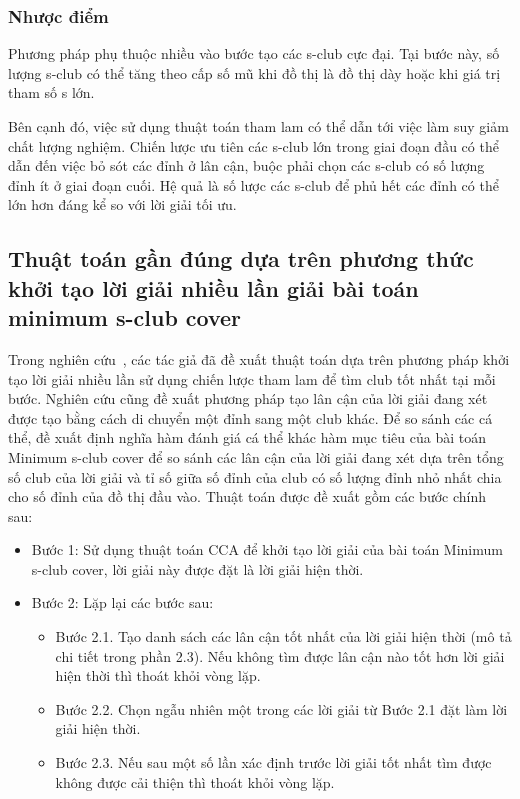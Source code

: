 \subsubsection{Nhược điểm}
Phương pháp phụ thuộc nhiều vào bước tạo các s-club cực đại. Tại bước này, số lượng s-club có thể tăng theo cấp số mũ khi đồ thị là đồ thị dày hoặc khi giá trị tham số s lớn.

Bên cạnh đó, việc sử dụng thuật toán tham lam có thể dẫn tới việc làm suy giảm chất lượng nghiệm. Chiến lược ưu tiên các s-club lớn trong giai đoạn đầu có thể dẫn đến việc bỏ sót các đỉnh ở lân cận, buộc phải chọn các s-club có số lượng đỉnh ít ở giai đoạn cuối. Hệ quả là số lược các s-club để phủ hết các đỉnh có thể lớn hơn đáng kể so với lời giải tối ưu.


\subsection{Thuật toán gần đúng dựa trên phương thức khởi tạo lời giải nhiều lần giải bài toán minimum s-club cover~\cite{thanh2023}}

Trong nghiên cứu~\cite{thanh2023}, các tác giả đã đề xuất thuật toán dựa trên phương pháp khởi tạo lời giải nhiều lần sử dụng chiến lược tham lam để tìm club tốt nhất tại mỗi bước. Nghiên cứu cũng đề xuất phương pháp tạo lân cận của lời giải đang xét được tạo bằng cách di chuyển một đỉnh sang một club khác. Để so sánh các cá thể, đề xuất định nghĩa hàm đánh giá cá thể khác hàm mục tiêu của bài toán Minimum s-club cover để so sánh các lân cận của lời giải đang xét dựa trên tổng số club của lời giải và tỉ số giữa số đỉnh của club có số lượng đỉnh nhỏ nhất chia cho số đỉnh của đồ thị đầu vào. Thuật toán được đề xuất gồm các bước chính sau:
\begin{itemize}
	\item Bước 1: Sử dụng thuật toán CCA để khởi tạo lời giải của bài toán Minimum s-club cover, lời giải này được đặt là lời giải hiện thời.
	\item Bước 2: Lặp lại các bước sau:
	\begin{itemize}
		\item Bước 2.1. Tạo danh sách các lân cận tốt nhất của lời giải hiện thời (mô tả chi tiết trong phần 2.3). Nếu không tìm được lân cận nào tốt hơn lời giải hiện thời thì thoát khỏi vòng lặp.
		
		\item Bước 2.2. Chọn ngẫu nhiên một trong các lời giải từ Bước 2.1 đặt làm lời giải hiện thời.
		
		\item Bước 2.3. Nếu sau một số lần xác định trước lời giải tốt nhất tìm được không được cải thiện thì thoát khỏi vòng lặp.
	\end{itemize}
\end{itemize}

